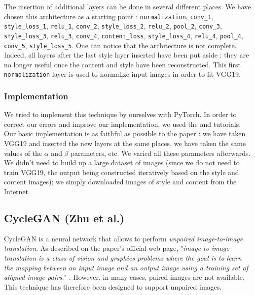 \documentclass[twocolumn,superscriptaddress,aps,floatfix,nofootinbib]{revtex4-1}
\begin{document}
    The insertion of additional layers can be done in several different places. We have chosen this architecture as a starting point : \texttt{normalization}, \texttt{conv\_1}, \texttt{style\_loss\_1}, \texttt{relu\_1}, \texttt{conv\_2}, \texttt{style\_loss\_2}, \texttt{relu\_2}, \texttt{pool\_2}, \texttt{conv\_3}, \texttt{style\_loss\_3}, \texttt{relu\_3}, \texttt{conv\_4}, \texttt{content\_loss}, \texttt{style\_loss\_4}, \texttt{relu\_4}, \texttt{pool\_4}, \texttt{conv\_5}, \texttt{style\_loss\_5}. One can notice that the architecture is not complete. Indeed, all layers after the last style layer inserted have been put aside : they are no longer useful once the content and style have been reconstructed. This first \texttt{normalization} layer is used to normalize input images in order to fit VGG19.
    
    \subsubsection{Implementation}
    
    We tried to implement this technique by ourselves with PyTorch. In order to correct our errors and improve our implementation, we used the \cite{pytorch.org} and \cite{nextjournal.com} tutorials. Our basic implementation is as faithful as possible to the paper \cite{DBLP:journals/corr/GatysEB15a} : we have taken VGG19 and inserted the new layers at the same places, we have taken the same values of the $\alpha$ and $\beta$ parameters, etc. We varied all these parameters afterwards. We didn't need to build up a large dataset of images (since we do not need to train VGG19, the output being constructed iteratively based on the style and content images); we simply downloaded images of style and content from the Internet.
    
    \subsection{CycleGAN (Zhu et al.)}\label{sec:methods.zhu}
    
    CycleGAN is a neural network that allows to perform \emph{unpaired image-to-image translation}. As described on the paper's official web page, "\emph{image-to-image translation is a class of vision and graphics problems where the goal is to learn the mapping between an input image and an output image using a training set of aligned image pairs.}" \cite{junyanz.github.io}. However, in many cases, paired images are not available. This technique has therefore been designed to support unpaired images.\\
    
\end{document}
